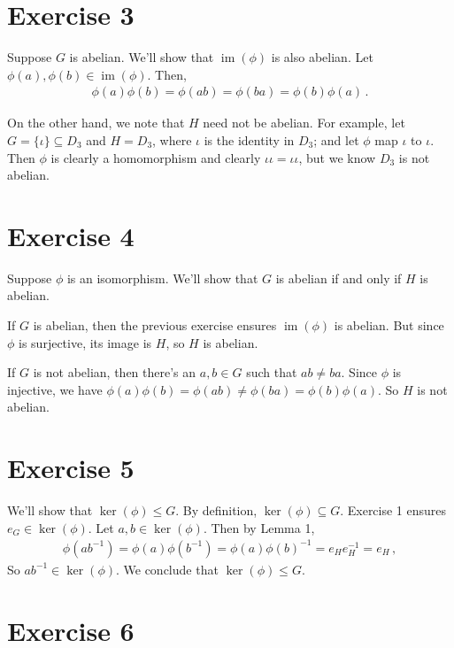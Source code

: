 \documentclass{article}
\DeclareMathOperator{\im}{im}
\begin{document}
\section*{Exercise 3}

Suppose $G$ is abelian. We'll show that $\im(\phi)$ is also abelian.
Let $\phi(a), \phi(b) \in \im(\phi)$. Then,
\begin{align*}
    \phi(a)\phi(b) = \phi(ab) = \phi(ba) = \phi(b)\phi(a) \,.
\end{align*}
\qedsymbol

On the other hand, we note that $H$ need not be abelian. For example, let $G = \{\iota\} \subseteq D_3$
and $H = D_3$, where $\iota$ is the identity in $D_3$; and let $\phi$
map $\iota$ to $\iota$. Then $\phi$ is clearly a homomorphism and clearly $\iota\iota = \iota\iota$,
but we know $D_3$ is not abelian.

\section*{Exercise 4}

Suppose $\phi$ is an isomorphism.
We'll show that $G$ is abelian if and only if
$H$ is abelian.

If $G$ is abelian,
then the previous exercise ensures
$\im(\phi)$ is abelian.
But since $\phi$ is surjective, its image is $H$, so $H$ is abelian.

If $G$ is not abelian, then there's an $a, b \in G$ such that
$ab \neq ba$. Since $\phi$ is injective, we have
$\phi(a)\phi(b) = \phi(ab) \neq \phi(ba) = \phi(b)\phi(a)$.
So $H$ is not abelian.
\qedsymbol

\section*{Exercise 5}

We'll show that $\ker(\phi) \leq G$. By definition, $\ker(\phi) \subseteq G$.
Exercise 1 ensures $e_G \in \ker(\phi)$.
Let $a, b \in \ker(\phi)$.
Then by Lemma 1,
\begin{align*}
    \phi(ab^{-1}) = \phi(a) \phi(b^{-1}) = \phi(a) \phi(b)^{-1} = e_H e_H^{-1} = e_H \,,
\end{align*}
So $ab^{-1} \in \ker(\phi)$. We conclude that $\ker(\phi) \leq G$.
\qedsymbol

\section*{Exercise 6}
\end{document}
